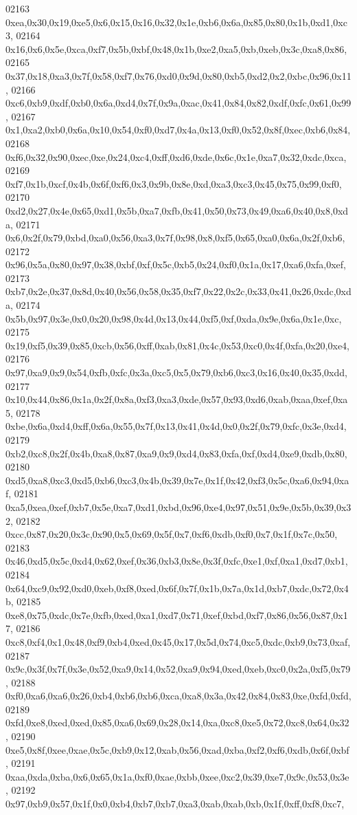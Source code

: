 \begin{DoxyCode}
02163   0xea,0x30,0x19,0xe5,0x6,0x15,0x16,0x32,0x1e,0xb6,0x6a,0x85,0x80,0x1b,0xd1,0xc3,
02164   0x16,0x6,0x5e,0xca,0xf7,0x5b,0xbf,0x48,0x1b,0xe2,0xa5,0xb,0xeb,0x3c,0xa8,0x86,
02165   0x37,0x18,0xa3,0x7f,0x58,0xf7,0x76,0xd0,0x9d,0x80,0xb5,0xd2,0x2,0xbc,0x96,0x11,
02166   0xc6,0xb9,0xdf,0xb0,0x6a,0xd4,0x7f,0x9a,0xac,0x41,0x84,0x82,0xdf,0xfc,0x61,0x99,
02167   0x1,0xa2,0xb0,0x6a,0x10,0x54,0xf0,0xd7,0x4a,0x13,0xf0,0x52,0x8f,0xec,0xb6,0x84,
02168   0xf6,0x32,0x90,0xec,0xe,0x24,0xc4,0xff,0xd6,0xde,0x6c,0x1e,0xa7,0x32,0xdc,0xca,
02169   0xf7,0x1b,0xcf,0x4b,0x6f,0xf6,0x3,0x9b,0x8e,0xd,0xa3,0xc3,0x45,0x75,0x99,0xf0,
02170   0xd2,0x27,0x4e,0x65,0xd1,0x5b,0xa7,0xfb,0x41,0x50,0x73,0x49,0xa6,0x40,0x8,0xda,
02171   0x6,0x2f,0x79,0xbd,0xa0,0x56,0xa3,0x7f,0x98,0x8,0xf5,0x65,0xa0,0x6a,0x2f,0xb6,
02172   0x96,0x5a,0x80,0x97,0x38,0xbf,0xf,0x5c,0xb5,0x24,0xf0,0x1a,0x17,0xa6,0xfa,0xef,
02173   0xb7,0x2e,0x37,0x8d,0x40,0x56,0x58,0x35,0xf7,0x22,0x2c,0x33,0x41,0x26,0xdc,0xda,
02174   0x5b,0x97,0x3e,0x0,0x20,0x98,0x4d,0x13,0x44,0xf5,0xf,0xda,0x9e,0x6a,0x1e,0xc,
02175   0x19,0xf5,0x39,0x85,0xcb,0x56,0xff,0xab,0x81,0x4c,0x53,0xc0,0x4f,0xfa,0x20,0xe4,
02176   0x97,0xa9,0x9,0x54,0xfb,0xfc,0x3a,0xc5,0x5,0x79,0xb6,0xc3,0x16,0x40,0x35,0xdd,
02177   0x10,0x44,0x86,0x1a,0x2f,0x8a,0xf3,0xa3,0xde,0x57,0x93,0xd6,0xab,0xaa,0xef,0xa5,
02178   0xbe,0x6a,0xd4,0xff,0x6a,0x55,0x7f,0x13,0x41,0x4d,0x0,0x2f,0x79,0xfc,0x3e,0xd4,
02179   0xb2,0xc8,0x2f,0x4b,0xa8,0x87,0xa9,0x9,0xd4,0x83,0xfa,0xf,0xd4,0xe9,0xdb,0x80,
02180   0xd5,0xa8,0xc3,0xd5,0xb6,0xc3,0x4b,0x39,0x7e,0x1f,0x42,0xf3,0x5c,0xa6,0x94,0xaf,
02181   0xa5,0xea,0xef,0xb7,0x5e,0xa7,0xd1,0xbd,0x96,0xe4,0x97,0x51,0x9e,0x5b,0x39,0x32,
02182   0xcc,0x87,0x20,0x3c,0x90,0x5,0x69,0x5f,0x7,0xf6,0xdb,0xf0,0x7,0x1f,0x7c,0x50,
02183   0x46,0xd5,0x5c,0xd4,0x62,0xef,0x36,0xb3,0x8e,0x3f,0xfc,0xe1,0xf,0xa1,0xd7,0xb1,
02184   0x64,0xc9,0x92,0xd0,0xeb,0xf8,0xed,0x6f,0x7f,0x1b,0x7a,0x1d,0xb7,0xdc,0x72,0x4b,
02185   0xe8,0x75,0xdc,0x7e,0xfb,0xed,0xa1,0xd7,0x71,0xef,0xbd,0xf7,0x86,0x56,0x87,0x17,
02186   0xc8,0xf4,0x1,0x48,0xf9,0xb4,0xed,0x45,0x17,0x5d,0x74,0xc5,0xdc,0xb9,0x73,0xaf,
02187   0x9c,0x3f,0x7f,0x3e,0x52,0xa9,0x14,0x52,0xa9,0x94,0xed,0xeb,0xc0,0x2a,0xf5,0x79,
02188   0xf0,0xa6,0xa6,0x26,0xb4,0xb6,0xb6,0xca,0xa8,0x3a,0x42,0x84,0x83,0xe,0xfd,0xfd,
02189   0xfd,0xe8,0xed,0xed,0x85,0xa6,0x69,0x28,0x14,0xa,0xc8,0xe5,0x72,0xc8,0x64,0x32,
02190   0xe5,0x8f,0xee,0xae,0x5c,0xb9,0x12,0xab,0x56,0xad,0xba,0xf2,0xf6,0xdb,0x6f,0xbf,
02191   0xaa,0xda,0xba,0x6,0x65,0x1a,0xf0,0xae,0xbb,0xee,0xc2,0x39,0xe7,0x9c,0x53,0x3e,
02192   0x97,0xb9,0x57,0x1f,0x0,0xb4,0xb7,0xb7,0xa3,0xab,0xab,0xb,0x1f,0xff,0xf8,0xc7,

\end{DoxyCode}
